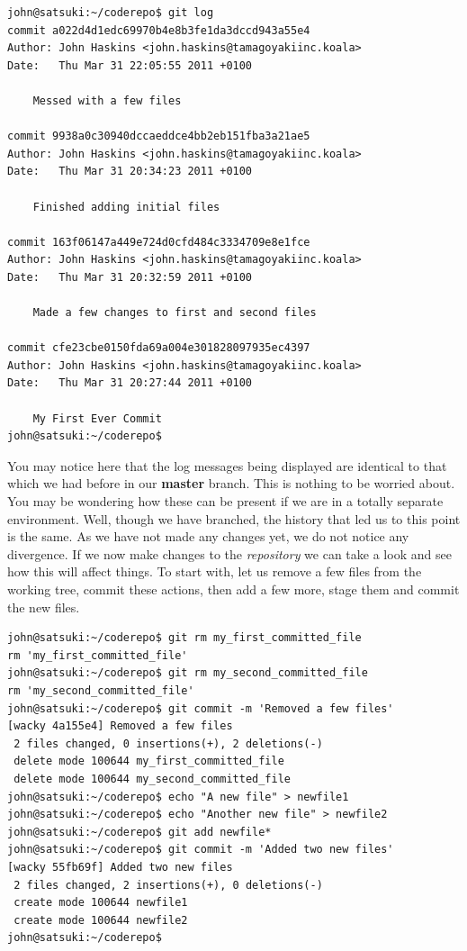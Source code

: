 \begin{Verbatim}
john@satsuki:~/coderepo$ git log
commit a022d4d1edc69970b4e8b3fe1da3dccd943a55e4
Author: John Haskins <john.haskins@tamagoyakiinc.koala>
Date:   Thu Mar 31 22:05:55 2011 +0100

    Messed with a few files

commit 9938a0c30940dccaeddce4bb2eb151fba3a21ae5
Author: John Haskins <john.haskins@tamagoyakiinc.koala>
Date:   Thu Mar 31 20:34:23 2011 +0100

    Finished adding initial files

commit 163f06147a449e724d0cfd484c3334709e8e1fce
Author: John Haskins <john.haskins@tamagoyakiinc.koala>
Date:   Thu Mar 31 20:32:59 2011 +0100

    Made a few changes to first and second files

commit cfe23cbe0150fda69a004e301828097935ec4397
Author: John Haskins <john.haskins@tamagoyakiinc.koala>
Date:   Thu Mar 31 20:27:44 2011 +0100

    My First Ever Commit
john@satsuki:~/coderepo$
\end{Verbatim}

You may notice here that the log messages being displayed are identical to that which we had before in our \textbf{master} branch.
This is nothing to be worried about.
You may be wondering how these can be present if we are in a totally separate environment.
Well, though we have branched, the history that led us to this point is the same.
As we have not made any changes yet, we do not notice any divergence.
If we now make changes to the \emph{repository} we can take a look and see how this will affect things.
To start with, let us remove a few files from the working tree, commit these actions, then add a few more, stage them and commit the new files.

\begin{Verbatim}
john@satsuki:~/coderepo$ git rm my_first_committed_file
rm 'my_first_committed_file'
john@satsuki:~/coderepo$ git rm my_second_committed_file
rm 'my_second_committed_file'
john@satsuki:~/coderepo$ git commit -m 'Removed a few files'
[wacky 4a155e4] Removed a few files
 2 files changed, 0 insertions(+), 2 deletions(-)
 delete mode 100644 my_first_committed_file
 delete mode 100644 my_second_committed_file
john@satsuki:~/coderepo$ echo "A new file" > newfile1
john@satsuki:~/coderepo$ echo "Another new file" > newfile2
john@satsuki:~/coderepo$ git add newfile*
john@satsuki:~/coderepo$ git commit -m 'Added two new files'
[wacky 55fb69f] Added two new files
 2 files changed, 2 insertions(+), 0 deletions(-)
 create mode 100644 newfile1
 create mode 100644 newfile2
john@satsuki:~/coderepo$
\end{Verbatim}

